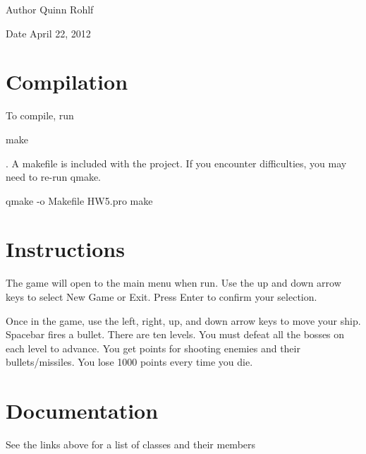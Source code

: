 \begin{DoxyAuthor}{Author}
Quinn Rohlf 
\end{DoxyAuthor}
\begin{DoxyDate}{Date}
April 22, 2012 
\end{DoxyDate}
\hypertarget{index_intro_sec}{}\section{Compilation}\label{index_intro_sec}
To compile, run 
\begin{DoxyCode}
 make 
\end{DoxyCode}
. A makefile is included with the project. If you encounter difficulties, you may need to re-\/run qmake. 
\begin{DoxyCode}
  qmake -o Makefile HW5.pro
  make
\end{DoxyCode}
 \hypertarget{index_instructions_sec}{}\section{Instructions}\label{index_instructions_sec}
The game will open to the main menu when run. Use the up and down arrow keys to select New Game or Exit. Press Enter to confirm your selection.

Once in the game, use the left, right, up, and down arrow keys to move your ship. Spacebar fires a bullet. There are ten levels. You must defeat all the bosses on each level to advance. You get points for shooting enemies and their bullets/missiles. You lose 1000 points every time you die.\hypertarget{index_documentation_sec}{}\section{Documentation}\label{index_documentation_sec}
See the links above for a list of classes and their members 